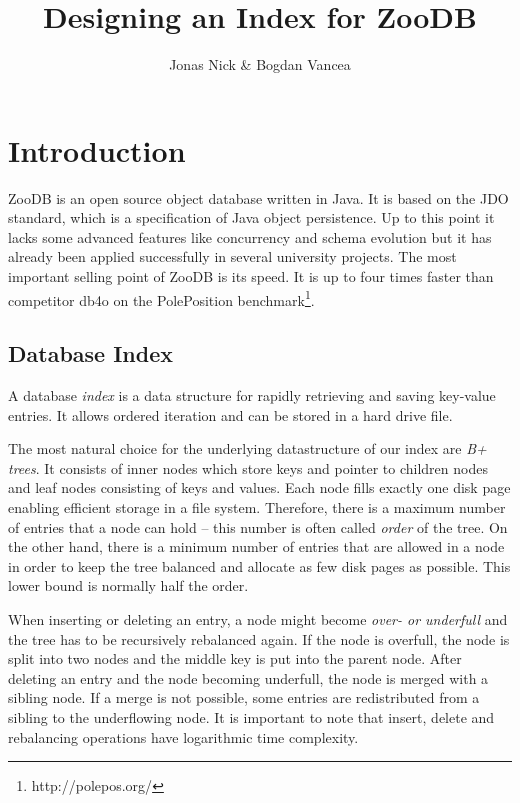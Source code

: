 \documentclass[11pt,a4paper,oneside]{article}
\begin{document}
\graphicspath{ {images/} }
\title{Designing an Index for ZooDB}
\author{Jonas Nick \& Bogdan Vancea}
\maketitle
\tableofcontents
\clearpage

\section{Introduction}
ZooDB is an open source object database written in Java. It is based on the JDO standard, which is a specification of Java object persistence.
Up to this point it lacks some advanced features like concurrency and schema evolution but it has already been applied successfully in several university projects. 
The most important selling point of ZooDB is its speed. It is up to four times faster than competitor db4o on the PolePosition benchmark\footnote{http://polepos.org/}.

\subsection{Database Index}
A database \emph{index} is a data structure for rapidly retrieving and saving key-value entries. 
It allows ordered iteration and can be stored in a hard drive file.

The most natural choice for the underlying datastructure of our index are \emph{B+ trees}.
It consists of inner nodes which store keys and pointer to children nodes and leaf nodes consisting of keys and values.
Each node fills exactly one disk page enabling efficient storage in a file system.
Therefore, there is a maximum number of entries that a node can hold -- this number is often called \emph{order} of the tree.
On the other hand, there is a minimum number of entries that are allowed in a node in order to keep the tree balanced and allocate as few disk pages as possible.
This lower bound is normally half the order.

When inserting or deleting an entry, a node might become \emph{over- or underfull} and the tree has to be recursively rebalanced again.
If the node is overfull, the node is split into two nodes and the middle key is put into the parent node.
After deleting an entry and the node becoming underfull, the node is merged with a sibling node. If a merge is not possible, some entries are redistributed from a sibling to the underflowing node.
It is important to note that insert, delete and rebalancing operations have logarithmic time complexity.
\end{document}

